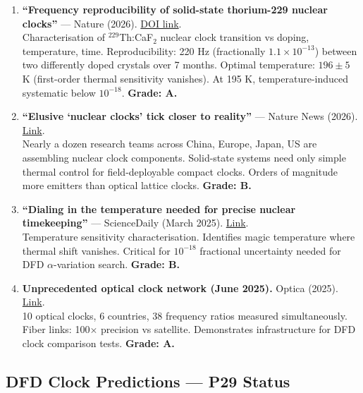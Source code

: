 \documentclass[11pt,a4paper]{article}
\begin{document}
\begin{enumerate}
\item \textbf{``Frequency reproducibility of solid-state thorium-229 nuclear clocks''} --- Nature (2026). \href{https://www.nature.com/articles/s41586-025-09999-5}{DOI link}.\\
Characterisation of $^{229}$Th:CaF$_2$ nuclear clock transition vs doping, temperature, time. Reproducibility: 220 Hz (fractionally $1.1 \times 10^{-13}$) between two differently doped crystals over 7 months. Optimal temperature: $196 \pm 5$ K (first-order thermal sensitivity vanishes). At 195 K, temperature-induced systematic below $10^{-18}$. \textbf{Grade: A.}

\item \textbf{``Elusive `nuclear clocks' tick closer to reality''} --- Nature News (2026). \href{https://www.nature.com/articles/d41586-026-00848-7}{Link}.\\
Nearly a dozen research teams across China, Europe, Japan, US are assembling nuclear clock components. Solid-state systems need only simple thermal control for field-deployable compact clocks. Orders of magnitude more emitters than optical lattice clocks. \textbf{Grade: B.}

\item \textbf{``Dialing in the temperature needed for precise nuclear timekeeping''} --- ScienceDaily (March 2025). \href{https://www.sciencedaily.com/releases/2025/03/250317184237.htm}{Link}.\\
Temperature sensitivity characterisation. Identifies magic temperature where thermal shift vanishes. Critical for $10^{-18}$ fractional uncertainty needed for DFD $\alpha$-variation search. \textbf{Grade: B.}

\item \textbf{Unprecedented optical clock network (June 2025).} Optica (2025). \href{https://www.optica.org/about/newsroom/news_releases/2025/unprecedented_optical_clock_network_lays_groundwork_for_redefining_the_second/}{Link}.\\
10 optical clocks, 6 countries, 38 frequency ratios measured simultaneously. Fiber links: 100$\times$ precision vs satellite. Demonstrates infrastructure for DFD clock comparison tests. \textbf{Grade: A.}
\end{enumerate}

\subsection{DFD Clock Predictions --- P29 Status}
\end{document}
